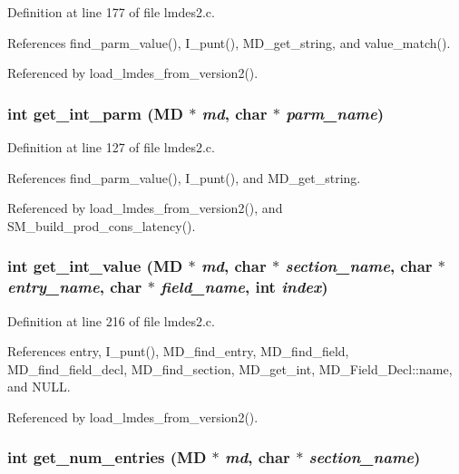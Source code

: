 Definition at line 177 of file lmdes2.c.

References find\_\-parm\_\-value(), I\_\-punt(), MD\_\-get\_\-string, and value\_\-match().

Referenced by load\_\-lmdes\_\-from\_\-version2().
\subsubsection{\setlength{\rightskip}{0pt plus 5cm}int get\_\-int\_\-parm (\bf{MD} $\ast$ {\em md}, char $\ast$ {\em parm\_\-name})}\label{lmdes2_8c_b72d20b5453850f8f529b452f87f0c6b}




Definition at line 127 of file lmdes2.c.

References find\_\-parm\_\-value(), I\_\-punt(), and MD\_\-get\_\-string.

Referenced by load\_\-lmdes\_\-from\_\-version2(), and SM\_\-build\_\-prod\_\-cons\_\-latency().
\subsubsection{\setlength{\rightskip}{0pt plus 5cm}int get\_\-int\_\-value (\bf{MD} $\ast$ {\em md}, char $\ast$ {\em section\_\-name}, char $\ast$ {\em entry\_\-name}, char $\ast$ {\em field\_\-name}, int {\em index})}\label{lmdes2_8c_43559819289a0e8fab0c93489486f057}




Definition at line 216 of file lmdes2.c.

References entry, I\_\-punt(), MD\_\-find\_\-entry, MD\_\-find\_\-field, MD\_\-find\_\-field\_\-decl, MD\_\-find\_\-section, MD\_\-get\_\-int, MD\_\-Field\_\-Decl::name, and NULL.

Referenced by load\_\-lmdes\_\-from\_\-version2().
\subsubsection{\setlength{\rightskip}{0pt plus 5cm}int get\_\-num\_\-entries (\bf{MD} $\ast$ {\em md}, char $\ast$ {\em section\_\-name})}\label{lmdes2_8c_bebae7b6c0099bb98773c6352ead5f47}




